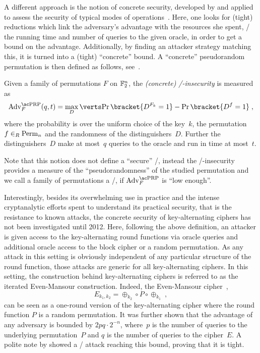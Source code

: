 A different approach is the notion of concrete security, developed by \textcite{C:BelKilRog94} and applied to assess the security of typical modes of operations~.
Here, one looks for (tight) reductions which link the adversary's advantage with the resources she spent, \ie/ the running time and number of queries to the given oracle, in order to get a bound on the advantage.
Additionally, by finding an attacker strategy matching this, it is turned into a (tight) \enquote{concrete} bound.
A \enquote{concrete} pseudorandom permutation is then defined as follows, see~\cite[Definition~2.2]{C:BelKilRog94}.
\begin{definition}\label{def:concrete-prp}
    Given a family of permutations $F$ on $\mathbb{F}_2^n$, the \emph{(concrete) \PRP/-insecurity} is measured as
    \begin{equation*}
        \mathrm{Adv}^{\text{\PRP/}}_F(q,t) = \max_D \abs{\Prob\bracket{D^{F_k} = 1} - \Prob\bracket{D^{f} = 1}}\;,
    \end{equation*}
    where the probability is over the uniform choice of the key~$k$, the permutation $f \in_R \perm/_n$ and the randomness of the distinguishers~$D$.
    Further the distinguishers~$D$ make at most~$q$ queries to the oracle and run in time at most~$t$.
\end{definition}
Note that this notion does not define a \enquote{secure} \PRP/, instead the \PRP/-insecurity provides a measure of the \enquote{pseudorandomness} of the studied permutation and we call a family of permutations a \PRP/, if $\mathrm{Adv}^{\text{\PRP/}}_F$ is \enquote{low enough}.

Interestingly, besides its overwhelming use in practice and the intense cryptanalytic efforts spent to understand its practical security, that is the resistance to known attacks, the concrete security of key-alternating ciphers has not been investigated until 2012.
Here, following the above definition, an attacker is given access to the key-alternating round functions via oracle queries and additional oracle access to the block cipher or a random permutation.
As any attack in this setting is obviously independent of any particular structure of the round function, those attacks are generic for all key-alternating ciphers.
In this setting, the construction behind key-alternating ciphers is referred to as the iterated Even-Mansour construction.
Indeed, the Even-Mansour cipher~\cite{JC:EveMan97},
\begin{equation*}
    E_{k_1,k_2} = \oplus_{k_2} \circ P \circ \oplus_{k_1}\;,
\end{equation*}
can be seen as a one-round version of the key-alternating cipher where the round function $P$ is a random permutation.
It was further shown that the advantage of any adversary is bounded by $2pq \cdot 2^{-n}$, where~$p$ is the number of queries to the underlying permutation~$P$ and $q$ is the number of queries to the cipher~$E$.
A polite note by \textcite{AC:Daemen91} showed a \CPA/ attack reaching this bound, proving that it is tight.

